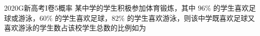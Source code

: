 
\begin{problem}{2020}{G}{新高考I卷}{5}{概率}
某中学的学生积极参加体育锻炼，其中 $ 96\% $ 的学生喜欢足球或游泳，$ 60\% $ 的学生喜欢足球，$ 82\% $ 的学生喜欢游泳，则该中学既喜欢足球又喜欢游泳的学生数占该校学生总数的比例如为
\begin{choices}
\end{choices}
\end{problem}

\begin{answer}

\end{answer}

\begin{solutions}

\end{solutions}